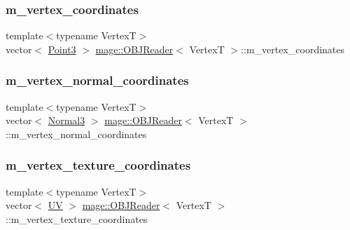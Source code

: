 \hypertarget{classmage_1_1_o_b_j_reader_a1032eb4a6844a99f1d96fc17c3e52aee}{}\label{classmage_1_1_o_b_j_reader_a1032eb4a6844a99f1d96fc17c3e52aee} 
\subsubsection{\texorpdfstring{m\+\_\+vertex\+\_\+coordinates}{m\_vertex\_coordinates}}
{\footnotesize\ttfamily template$<$typename VertexT$>$ \\
vector$<$ \hyperlink{structmage_1_1_point3}{Point3} $>$ \hyperlink{classmage_1_1_o_b_j_reader}{mage\+::\+O\+B\+J\+Reader}$<$ VertexT $>$\+::m\+\_\+vertex\+\_\+coordinates\hspace{0.3cm}{\ttfamily [private]}}

\hypertarget{classmage_1_1_o_b_j_reader_a765e87afe7bd138dadcfc8c194311ed3}{}\label{classmage_1_1_o_b_j_reader_a765e87afe7bd138dadcfc8c194311ed3} 
\subsubsection{\texorpdfstring{m\+\_\+vertex\+\_\+normal\+\_\+coordinates}{m\_vertex\_normal\_coordinates}}
{\footnotesize\ttfamily template$<$typename VertexT$>$ \\
vector$<$ \hyperlink{structmage_1_1_normal3}{Normal3} $>$ \hyperlink{classmage_1_1_o_b_j_reader}{mage\+::\+O\+B\+J\+Reader}$<$ VertexT $>$\+::m\+\_\+vertex\+\_\+normal\+\_\+coordinates\hspace{0.3cm}{\ttfamily [private]}}

\hypertarget{classmage_1_1_o_b_j_reader_aec7c093d380be0b8506f7b8fdf9c3ad1}{}\label{classmage_1_1_o_b_j_reader_aec7c093d380be0b8506f7b8fdf9c3ad1} 
\subsubsection{\texorpdfstring{m\+\_\+vertex\+\_\+texture\+\_\+coordinates}{m\_vertex\_texture\_coordinates}}
{\footnotesize\ttfamily template$<$typename VertexT$>$ \\
vector$<$ \hyperlink{structmage_1_1_u_v}{UV} $>$ \hyperlink{classmage_1_1_o_b_j_reader}{mage\+::\+O\+B\+J\+Reader}$<$ VertexT $>$\+::m\+\_\+vertex\+\_\+texture\+\_\+coordinates\hspace{0.3cm}{\ttfamily [private]}}

